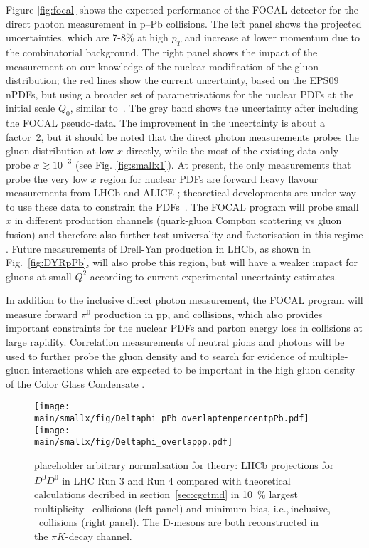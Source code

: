 \documentclass[../report.tex]{subfiles}
\providecommand{\main}{..}
\begin{document}
Figure \ref{fig:focal} shows the expected performance of the FOCAL detector for the direct photon measurement in p--Pb collisions. The left panel shows the projected uncertainties, which are 7-8\% at high $p_{T}$ and increase at lower momentum due to the combinatorial background. The right panel shows the impact of the measurement on our knowledge of the nuclear modification of the gluon distribution; the red lines show the current uncertainty, based on the EPS09 nPDFs, but using a broader set of parametrisations for the nuclear PDFs at the initial scale $Q_0$, similar to~\cite{Aschenauer:2017oxs}. The grey band shows the uncertainty after including the FOCAL pseudo-data. The improvement in the uncertainty is about a factor~2, but it should be noted that the direct photon measurements probes the gluon distribution at low $x$ directly, while the most of the existing data only probe $x \gtrsim 10^{-3}$ (see Fig. \ref{fig:smallx1}). At present, the only measurements that probe the very low $x$ region for nuclear PDFs are forward heavy flavour measurements from LHCb \cite{Aaij:2017gcy,Aaij:2017cqq} and ALICE \cite{Acharya:2017hdv}; theoretical developments are under way to use these data to constrain the PDFs~\cite{Kusina:2017gkz,Helenius:2018uul}. The FOCAL program will probe small $x$ in different production channels (quark-gluon Compton scattering vs gluon fusion) and therefore also further test universality and factorisation in this regime \cite{Helenius:2014qla}. Future measurements of Drell-Yan production in LHCb, as shown in Fig.~\ref{fig:DYRpPb}, will also probe this region, but will have a weaker impact for gluons at small $Q^2$ according to current experimental uncertainty estimates. 

In addition to the inclusive direct photon measurement, the FOCAL program will measure forward $\pi^{0}$ production in pp, \pPb and \PbPb collisions, which also provides important constraints for the nuclear PDFs and parton energy loss in \PbPb collisions at large rapidity. Correlation measurements of neutral pions and photons will be used to further probe the gluon density and to search for evidence of multiple-gluon interactions which are expected to be important in the high gluon density of the Color Glass Condensate \cite{Kharzeev:2004bw,vanHameren:2014lna}.



\clearpage
\newpage


\begin{figure}
\texttt{[image: \\main/smallx/fig/Deltaphi\_pPb\_overlaptenpercentpPb.pdf]}
\texttt{[image: \\main/smallx/fig/Deltaphi\_overlappp.pdf]}
\caption{ placeholder arbitrary normalisation for theory: LHCb projections for $D^0 \overline{D^0}$ in LHC Run 3 and Run 4 compared with theoretical calculations decribed in section~\ref{sec:cgctmd} in 10~\% largest multiplicity \pPb~collisions (left panel) and minimum bias, i.e.,\,inclusive, \pp~collisions (right panel). The D-mesons are  both reconstructed in the $\pi K$-decay channel.}
\label{fig:ccbarlhcb}
\end{figure}
\end{document}
